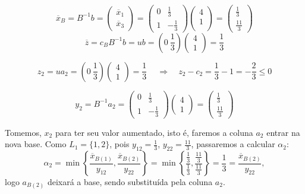 \documentclass[12pt]{exam}
\begin{document}
\begin{questions}
\begin{solution}
	$$ \overline{x}_B =B^{-1}b = \begin{pmatrix}
	\overline{x}_1 \\ 
	\overline{x}_3 
	\end{pmatrix} = \begin{pmatrix}
	0 & \frac{1}{3} \\
	1 & -\frac{1}{3}
	\end{pmatrix} \begin{pmatrix}
	4 \\ 
	1 \\ 
	\end{pmatrix} = \begin{pmatrix}
	\frac{1}{3} \\ 
	\frac{11}{3} 
	\end{pmatrix}$$
	$$\overline{z} = c_BB^{-1}b = ub = (0~\frac{1}{3}) \begin{pmatrix}
	4 \\ 
	1 
	\end{pmatrix} = \frac{1}{3}$$

	$$z_2 = ua_2 = (0~\frac{1}{3})\begin{pmatrix}
	4 \\ 
	1 
	\end{pmatrix} = \frac{1}{3}~\quad \Rightarrow \quad z_2 - c_2 = \frac{1}{3} - 1 = -\frac{2}{3} \leq 0$$


	$$y_2 = B^{-1}a_2 = \begin{pmatrix}
	0 & \frac{1}{3} \\
	1 & -\frac{1}{3}
	\end{pmatrix} \begin{pmatrix}
	4 \\ 
	1
	\end{pmatrix}=  \begin{pmatrix}
	\frac{1}{3} \\ 
	\frac{11}{3} 
	\end{pmatrix} $$

Tomemos, $x_2$ para ter seu valor aumentado, isto é, faremos a coluna $a_2$ entrar na nova base. Como $L_1 = \{1, 2\}$, pois $y_{12} = \frac{1}{3}$, $y_{22} = \frac{11}{3}$, passaremos a calcular $\alpha_2$:
$$\alpha_2 = \min\left\lbrace\frac{\overline{x}_{B(1)}}{y_{12}},\frac{\overline{x}_{B(2)}}{y_{22}}\right\rbrace  = \min\left\lbrace\frac{\frac{1}{3}}{\frac{1}{3}}, \frac{\frac{11}{3}}{\frac{11}{3}} \right\rbrace = \frac{1}{3} = \frac{\overline{x}_{B(2)}}{y_{22}},$$
logo $a_{B(2)}$ deixará a base, sendo substituída pela coluna $a_2$.


\end{solution}
\end{questions}
\end{document}
